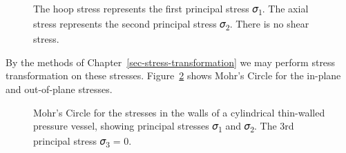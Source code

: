 \documentclass[
  letterpaper,
  DIV=11,
  numbers=noendperiod]{scrreprt}
\theoremstyle{definition}
\theoremstyle{remark}
\begin{document}
\begin{figure}


\caption{\label{fig-13.5}The hoop stress represents the first principal
stress 𝜎\textsubscript{1}. The axial stress represents the second
principal stress 𝜎\textsubscript{2}. There is no shear stress.}

\end{figure}%

By the methods of Chapter~\ref{sec-stress-transformation} we may perform
stress transformation on these stresses. Figure~\ref{fig-13.6} shows
Mohr's Circle for the in-plane and out-of-plane stresses.

\begin{figure}


\caption{\label{fig-13.6}Mohr's Circle for the stresses in the walls of
a cylindrical thin-walled pressure vessel, showing principal stresses
𝜎\textsubscript{1} and 𝜎\textsubscript{2}. The 3rd principal stress
𝜎\textsubscript{3} = 0.}

\end{figure}%
\end{document}
